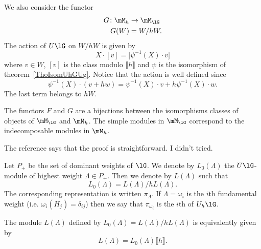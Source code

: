 We also consider the functor
\begin{equation}
	\begin{aligned}
		G\colon \mM_h & \to \mM_{\lG} \\
		G(W)          & = W/hW.
	\end{aligned}
\end{equation}
The action of \( U\lG\) on \( W/hW\) is given by
\begin{equation}
	X\cdot [v]=\big[ \psi^{-1}(X)\cdot v \big]
\end{equation}
where \( v\in W\), \( [v]\) is the class modulo \( \llbracket h\rrbracket\) and \( \psi\) is the isomorphism of theorem~\ref{ThoIsomUhGUg}. Notice that the action is well defined since
\begin{equation}
	\psi^{-1}(X)\cdot(v+hw)=\psi^{-1}(X)\cdot v+h\psi^{-1}(X)\cdot w.
\end{equation}
The last term belongs to \( hW\).

\begin{proposition}
	The functors \( F\) and \( G\) are a bijections between the isomorphisms classes of objects of \( \mM_{\lG}\) and \( \mM_h\). The simple modules in \( \mM_{\lG}\) correspond to the indecomposable modules in \( \mM_h\).
\end{proposition}
The reference \cite{SoibelmanI} says that the proof is straightforward. I didn't tried.

Let \( P_+\) be the set of dominant weights of \( \lG\). We denote by \( L_0(\Lambda)\) the \( U\lG\)-module of highest weight \( \Lambda\in P_+\). Then we denote by \( L(\Lambda)\) such that
\begin{equation}
	L_0(\Lambda)=L(\Lambda)/hL(\Lambda).
\end{equation}
The corresponding representation is written \( \pi_{\Lambda}\). If \( \Lambda=\omega_i\) is the \( i\)th fundamental weight (i.e. \( \omega_i(H_j)=\delta_{ij}\)) then we say that \( \pi_{\omega_i}\) is the \( i\)th  of \( U_h\lG\).

\begin{lemma}
	The module \( L(\Lambda)\) defined by \( L_0(\Lambda)=L(\Lambda)/hL(\Lambda) \) is equivalently given by
	\begin{equation}
		L(\Lambda)=L_0(\Lambda)\llbracket h\rrbracket.
	\end{equation}
\end{lemma}

